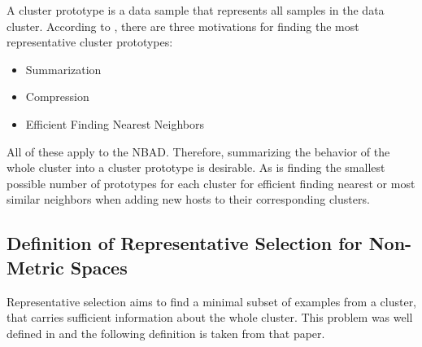 \documentclass[thesis=B,english]{FITthesis}[2012/10/20]
\begin{document}
A cluster prototype is a data sample that represents all samples in the data cluster.
According to \cite{tan2014introduction}, there are three motivations for finding the most representative cluster prototypes:
\begin{itemize}
    \item Summarization
    \item Compression
    \item Efficient Finding Nearest Neighbors
\end{itemize}
All of these apply to the NBAD.
Therefore, summarizing the behavior of the whole cluster into a cluster prototype is desirable.
As is finding the smallest possible number of prototypes for each cluster for efficient finding nearest or most similar neighbors when adding new hosts to their corresponding clusters.


\subsection{Definition of Representative Selection for Non-Metric Spaces}\label{sec:def_rep_selection}
Representative selection aims to find a minimal subset of examples from a cluster, that carries sufficient information about the whole cluster.
This problem was well defined in \cite{liebman2015representative} and the following definition is taken from that paper.
\end{document}
